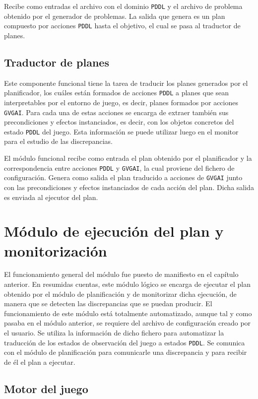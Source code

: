 Recibe como entradas el archivo con el dominio \texttt{PDDL} y el archivo de problema obtenido
por el generador de problemas. La salida que genera es un plan compuesto por acciones
\texttt{PDDL} hasta el objetivo, el cual se pasa al traductor de planes.

\subsection{Traductor de planes}

Este componente funcional tiene la tarea de traducir los planes generados por el planificador,
los cuáles están formados de acciones \texttt{PDDL} a planes que sean interpretables por el entorno
de juego, es decir, planes formados por acciones \texttt{GVGAI}. Para cada una de estas acciones
se encarga de extraer también sus precondiciones y efectos instanciados, es decir, con los objetos
concretos del estado \texttt{PDDL} del juego. Esta información se puede utilizar luego en el monitor
para el estudio de las discrepancias.

El módulo funcional recibe como entrada el plan obtenido por el planificador y la correspondencia
entre acciones \texttt{PDDL} y \texttt{GVGAI}, la cual proviene del fichero de configuración. Genera
como salida el plan traducido a acciones de \texttt{GVGAI} junto con las precondiciones y efectos
instanciados de cada acción del plan. Dicha salida es enviada al ejecutor del plan.

\section{Módulo de ejecución del plan y monitorización}

El funcionamiento general del módulo fue puesto de manifiesto en el capítulo anterior. En resumidas
cuentas, este módulo lógico se encarga de ejecutar el plan obtenido por el módulo de planificación
y de monitorizar dicha ejecución, de manera que se detecten las discrepancias que se puedan producir.
El funcionamiento de este módulo está totalmente automatizado, aunque tal y como pasaba en el módulo
anterior, se requiere del archivo de configuración creado por el usuario. Se utiliza la información
de dicho fichero para automatizar la traducción de los estados de observación del juego a estados
\texttt{PDDL}. Se comunica con el módulo de planificación para comunicarle una discrepancia
y para recibir de él el plan a ejecutar.

\subsection{Motor del juego}

